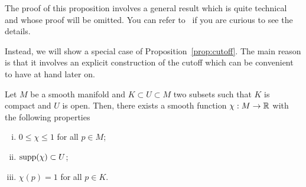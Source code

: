 The proof of this proposition involves a general result which is quite technical and whose proof will be omitted.
You can refer to~\cite{book:lee, book:tu} if you are curious to see the details.

Instead, we will show a special case of Proposition~\ref{prop:cutoff}. The main reason is that it involves an explicit construction of the cutoff which can be convenient to have at hand later on.

\begin{lemma}
	Let $M$ be a smooth manifold and $K\subset U\subset M$ two subsets such that $K$ is compact and $U$ is open.
	Then, there exists a smooth function $\chi: M \to\mathbb{R}$ with the following properties
	\begin{enumerate}[(i)]
		\item $0 \leq \chi \leq 1$ for all $p\in M$;
		\item $\operatorname{supp}(\chi)\subset U$;
		\item $\chi(p) = 1$ for all $p\in K$.
	\end{enumerate}
\end{lemma}
